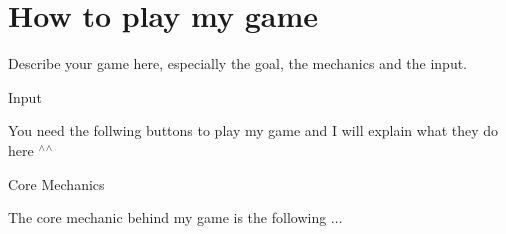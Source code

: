 \chapter{How to play my game }
\hypertarget{md_wiki_2game}{}\label{md_wiki_2game}
\label{md_wiki_2game_autotoc_md4}%
%


Describe your game here, especially the goal, the mechanics and the input.


\begin{DoxyEnumerate}
\item Input
\end{DoxyEnumerate}
\begin{DoxyItemize}
\item You need the follwing buttons to play my game and I will explain what they do here \texorpdfstring{$^\wedge$}{\string^}\texorpdfstring{$^\wedge$}{\string^}
\end{DoxyItemize}
\begin{DoxyEnumerate}
\item Core Mechanics
\end{DoxyEnumerate}
\begin{DoxyItemize}
\item The core mechanic behind my game is the following ... 
\end{DoxyItemize}